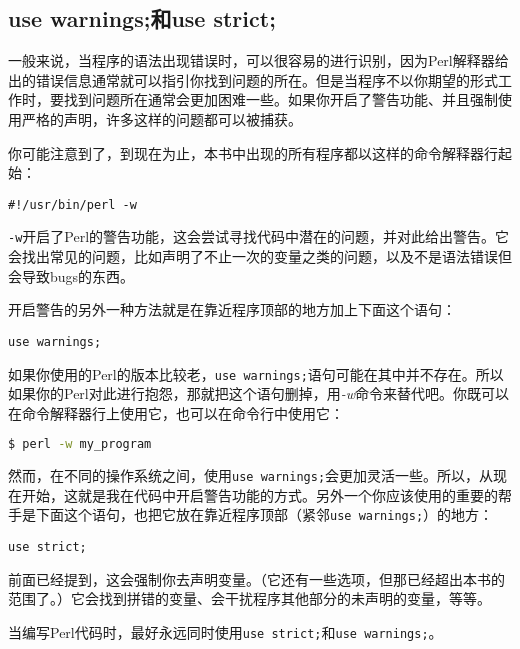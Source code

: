 \subsection{use warnings;和use strict;}
一般来说，当程序的语法出现错误时，可以很容易的进行识别，因为Perl解释器给出的错误信息通常就可以指引你找到问题的所在。但是当程序不以你期望的形式工作时，要找到问题所在通常会更加困难一些。如果你开启了警告功能、并且强制使用严格的声明，许多这样的问题都可以被捕获。

你可能注意到了，到现在为止，本书中出现的所有程序都以这样的命令解释器行起始：

\begin{lstlisting}
#!/usr/bin/perl -w
\end{lstlisting}

\verb|-w|开启了Perl的警告功能，这会尝试寻找代码中潜在的问题，并对此给出警告。它会找出常见的问题，比如声明了不止一次的变量之类的问题，以及不是语法错误但会导致bugs的东西。

开启警告的另外一种方法就是在靠近程序顶部的地方加上下面这个语句：

\begin{lstlisting}
use warnings;
\end{lstlisting}

如果你使用的Perl的版本比较老，\verb|use warnings;|语句可能在其中并不存在。所以如果你的Perl对此进行抱怨，那就把这个语句删掉，用\textit{-w}命令来替代吧。你既可以在命令解释器行上使用它，也可以在命令行中使用它：

\begin{lstlisting}[language=bash]
$ perl -w my_program
\end{lstlisting}

然而，在不同的操作系统之间，使用\verb|use warnings;|会更加灵活一些。所以，从现在开始，这就是我在代码中开启警告功能的方式。另外一个你应该使用的重要的帮手是下面这个语句，也把它放在靠近程序顶部（紧邻\verb|use warnings;|）的地方：

\begin{lstlisting}
use strict;
\end{lstlisting}

前面已经提到，这会强制你去声明变量。（它还有一些选项，但那已经超出本书的范围了。）它会找到拼错的变量、会干扰程序其他部分的未声明的变量，等等。

\begin{adjustwidth}{4em}{4em}
\noindent
当编写Perl代码时，最好永远同时使用\verb|use strict;|和\verb|use warnings;|。
\end{adjustwidth}

